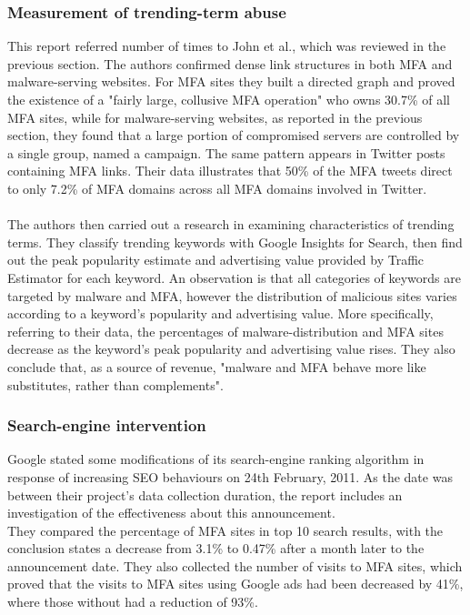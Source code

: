 \subsubsection{Measurement of trending-term abuse}
This report referred number of times to John et al.\cite{deseo}, which was 
reviewed in the previous section. The authors confirmed dense link structures in 
both MFA and malware-serving websites. For MFA sites they built a directed 
graph and proved the existence of a "fairly large, collusive MFA operation" 
who owns 30.7\% of all MFA sites, while for malware-serving websites, as 
reported in the previous section, they found that a large portion of 
compromised servers are controlled by a single group, named a campaign. The 
same pattern appears in Twitter posts containing MFA links. Their data 
illustrates that 50\% of the MFA tweets direct to only 7.2\% of MFA domains 
across all MFA domains involved in Twitter. 
\paragraph{}
The authors then carried out a research in examining characteristics of 
trending terms. They classify trending keywords with Google Insights for 
Search, then find out the peak popularity estimate and advertising value 
provided by Traffic Estimator for each keyword. An observation is that all 
categories of keywords are targeted by malware and MFA, however the 
distribution of malicious sites varies according to a keyword's popularity and 
advertising value. More specifically, referring to their data, the percentages 
of malware-distribution and MFA sites decrease as the keyword's peak 
popularity and advertising value rises. They also conclude that, as a source 
of revenue, "malware and MFA behave more like substitutes, rather than 
complements".\cite{moore2011fashion}
\subsubsection{Search-engine intervention}
Google stated some modifications of its search-engine ranking algorithm in 
response of increasing SEO behaviours on 24th February, 2011. As the date was 
between their project's data collection duration, the report includes an 
investigation of the effectiveness about this announcement. \\
They compared the percentage of MFA sites in top 10 search results, with the 
conclusion states a decrease from 3.1\% to 0.47\% after a month later to the 
announcement date. They also collected the number of visits to MFA sites, 
which proved that the visits to MFA sites using Google ads had been decreased 
by 41\%, where those without had a reduction of 93\%. 
